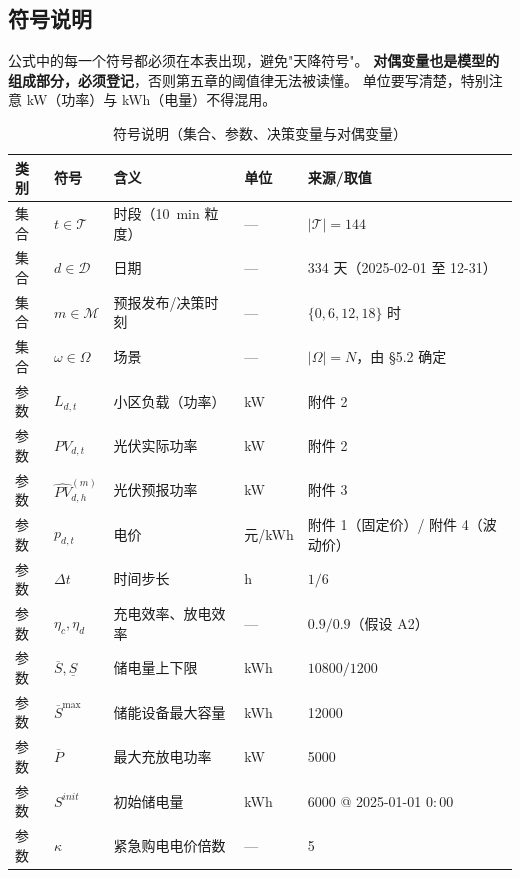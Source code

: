 \subsection{符号说明}

\begin{guideblock}
公式中的每一个符号都必须在本表出现，避免"天降符号"。
\textbf{对偶变量也是模型的组成部分，必须登记}，否则第五章的阈值律无法被读懂。
单位要写清楚，特别注意 kW（功率）与 kWh（电量）不得混用。
\end{guideblock}

\begin{table}[htbp]
  \centering
  \caption{符号说明（集合、参数、决策变量与对偶变量）}
  \label{tab:notation}
  \footnotesize
  \begin{tabularx}{\linewidth}{C{1.2cm} C{2.6cm} L{5.2cm} C{1.6cm} Y}
    \toprule
    类别 & 符号 & 含义 & 单位 & 来源/取值 \\
    \midrule
    集合 & \(t\in\mathcal T\) & 时段（10~min 粒度） & --- & \(|\mathcal T|=144\) \\
    集合 & \(d\in\mathcal D\) & 日期 & --- & 334 天（2025-02-01 至 12-31） \\
    集合 & \(m\in\mathcal M\) & 预报发布/决策时刻 & --- & \(\{0,6,12,18\}\) 时 \\
    集合 & \(\omega\in\Omega\) & 场景 & --- & \(|\Omega|=N\)，由 §5.2 确定 \\
    \addlinespace
    参数 & \(L_{d,t}\) & 小区负载（功率） & kW & 附件 2 \\
    参数 & \(PV_{d,t}\) & 光伏实际功率 & kW & 附件 2 \\
    参数 & \(\widehat{PV}^{(m)}_{d,h}\) & 光伏预报功率 & kW & 附件 3 \\
    参数 & \(p_{d,t}\) & 电价 & 元/kWh & 附件 1（固定价）/ 附件 4（波动价） \\
    参数 & \(\Delta t\) & 时间步长 & h & \(1/6\) \\
    参数 & \(\eta_c,\eta_d\) & 充电效率、放电效率 & --- & \(0.9/0.9\)（假设 A2） \\
    参数 & \(\overline S,\underline S\) & 储电量上下限 & kWh & \(10800/1200\) \\
    参数 & \(\overline S^{\max}\) & 储能设备最大容量 & kWh & 12000 \\
    参数 & \(\overline P\) & 最大充放电功率 & kW & 5000 \\
    参数 & \(S^{init}\) & 初始储电量 & kWh & 6000 @ 2025-01-01 \(0{:}00\) \\
    参数 & \(\kappa\) & 紧急购电电价倍数 & --- & 5 \\

\end{tabularx}
\end{table}
